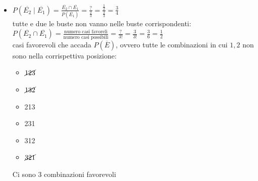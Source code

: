 \documentclass{article}  %
\theoremstyle{definition}
\begin{document}
\begin{esercizio}[Esercizio]
\begin{itemize}
\begin{itemize}
			      \item 231
			      \item 312
			      \item 321
		      \end{itemize}
		      \begin{enumerate}
			      \item casi favorevoli che accada $P(\overline{E})$, ovvero tutte le combinazioni in cui $1$ non è nella prima posizione:
			            \begin{itemize}
				            \item $\cancel{123}$
				            \item $\cancel{132}$
				            \item 213
				            \item 231
				            \item 312
				            \item 321
			            \end{itemize}
			            Ci sono $4$ combinazioni favorevoli
		      \end{enumerate}
		\item $P(\overline{E_2} \mid \overline{E_1})=\frac{\overline{E_2} \cap \overline{E_1}}{P(\overline{E_1})}=\frac{?}{\frac{2}{3}}=\frac{\frac{1}{2}}{\frac{2}{3}}=\frac{3}{4}$ \\
		      tutte e due le buste non vanno nelle buste corrispondenti: \\
		      $P(\overline{E_2} \cap \overline{E_1})=\frac{\text{numero casi favoreli}}{\text{numero casi possibili}}=\frac{?}{3!}=\frac{3}{3!}=\frac{3}{6}=\frac{1}{2}$ \\

		      casi favorevoli che accada $P(\overline{E})$, ovvero tutte le combinazioni in cui $1,2$ non sono nella corrispettiva posizione:
		      \begin{itemize}
			      \item $\cancel{123}$
			      \item $\cancel{132}$
			      \item 213
			      \item 231
			      \item 312
			      \item $\cancel{321}$
		      \end{itemize}
		      Ci sono $3$ combinazioni favorevoli


\end{itemize}
\end{esercizio}
\end{document}

